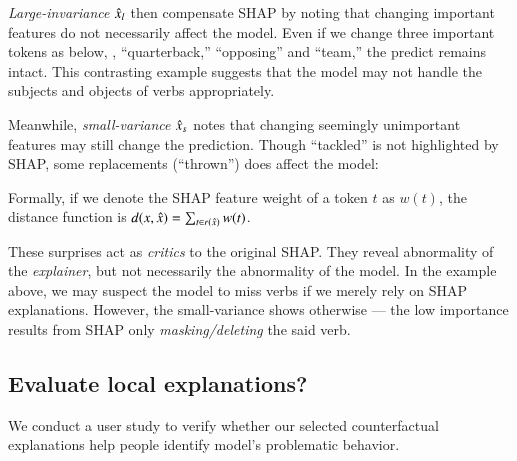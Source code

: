 
\emph{Large-invariance} $\hat{x}_l$ then compensate SHAP by noting that changing important features do not necessarily affect the model.
Even if we change three important tokens as below, \ie, ``quarterback,'' ``opposing'' and ``team,'' the predict remains intact. 
This contrasting example suggests that the model may not handle the subjects and objects of verbs appropriately.


Meanwhile, \emph{small-variance} $\hat{x}_s$ notes that changing seemingly unimportant features may still change the prediction.
Though ``tackled'' is not highlighted by SHAP, some replacements (\eg ``thrown'') does affect the model:


Formally, if we denote the SHAP feature weight of a token $t$ as $w(t)$, the distance function is $d(x, \hat{x}) = \sum_{t \in r(\hat{x})} w(t)$.

These surprises act as \emph{critics} to the original SHAP.
They reveal abnormality of the \emph{explainer}, but not necessarily the abnormality of the model.
In the example above, we may suspect the model to miss verbs if we merely rely on SHAP explanations. However, the small-variance shows otherwise --- the low importance results from SHAP only \emph{masking/deleting} the said verb.


\subsection{Evaluate local explanations?}
We conduct a user study to verify whether our selected counterfactual explanations help people identify model's problematic behavior.

